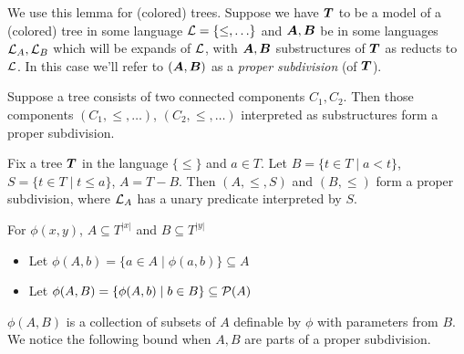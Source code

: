 \documentclass{amsart}
\DeclareMathOperator{\TT}{\boldface T}
\DeclareMathOperator{\A}{\boldface A}
\DeclareMathOperator{\B}{\boldface B}
\begin{document}
We use this lemma for (colored) trees. Suppose we have $\TT$ to be a model of a (colored) tree in some language $\mathcal L = \{\leq, \ldots\}$ and $\A, \B$ be in some languages $\mathcal L_A, \mathcal L_B$ which will be expands of $\mathcal L$, with $\A, \B$ substructures of $\TT$ as reducts to $\mathcal L$. In this case we'll refer to $(\A, \B)$ as a \emph{proper subdivision} (of $\TT$).

\begin{Example}
	Suppose a tree consists of two connected components $C_1, C_2$. Then those components $(C_1, \leq, \ldots)$, $(C_2, \leq, \ldots)$ interpreted as substructures form a proper subdivision.
\end{Example}


\begin{Example} \label{ex_cone}
	Fix a tree $\TT$ in the language $\{\leq\}$ and $a \in T$. Let $B = \{t \in T \mid a < t\}$, $S = \{t \in T \mid t \leq a\}$, $A = T - B$. Then $(A, \leq, S)$ and $(B, \leq)$ form a proper subdivision, where $\mathcal L_A$ has a unary predicate interpreted by $S$.
\end{Example}

\begin{Definition} For $\phi(x, y)$, $A \subseteq T^{|x|}$ and $B \subseteq T^{|y|}$
\begin{itemize}
	\item Let $\phi(A, b) = \{a \in A \mid \phi(a, b)\} \subseteq A$
	\item Let $\phi(A, B) = \{\phi(A, b) \mid b \in B\} \subseteq \mathcal P(A)$	
\end{itemize}
\end{Definition}
$\phi(A, B)$ is a collection of subsets of $A$ definable by $\phi$ with parameters from $B$. We notice the following bound when $A, B$ are parts of a proper subdivision.
\end{document}
